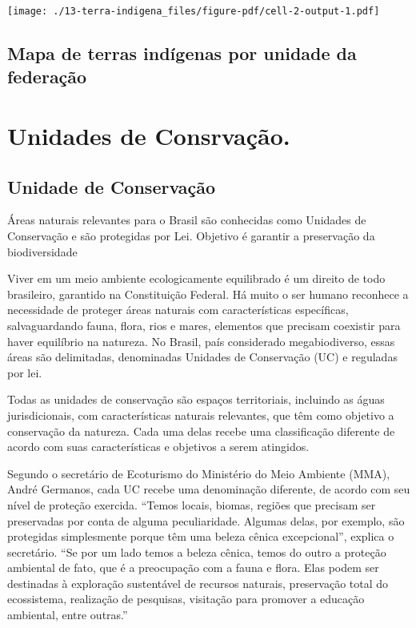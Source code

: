 \documentclass[
  letterpaper,
]{report}
\begin{document}
\texttt{[image: ./13-terra-indigena\_files/figure-pdf/cell-2-output-1.pdf]}

\hypertarget{mapa-de-terras-induxedgenas-por-unidade-da-federauxe7uxe3o}{%
\section{Mapa de terras indígenas por unidade da
federação}\label{mapa-de-terras-induxedgenas-por-unidade-da-federauxe7uxe3o}}


\hypertarget{unidades-de-consrvauxe7uxe3o.}{%
\chapter{Unidades de Consrvação.}\label{unidades-de-consrvauxe7uxe3o.}}

\hypertarget{unidade-de-conservauxe7uxe3o}{%
\section{Unidade de Conservação}\label{unidade-de-conservauxe7uxe3o}}

Áreas naturais relevantes para o Brasil são conhecidas como Unidades de
Conservação e são protegidas por Lei. Objetivo é garantir a preservação
da biodiversidade

Viver em um meio ambiente ecologicamente equilibrado é um direito de
todo brasileiro, garantido na Constituição Federal. Há muito o ser
humano reconhece a necessidade de proteger áreas naturais com
características específicas, salvaguardando fauna, flora, rios e mares,
elementos que precisam coexistir para haver equilíbrio na natureza. No
Brasil, país considerado megabiodiverso, essas áreas são delimitadas,
denominadas Unidades de Conservação (UC) e reguladas por lei.

Todas as unidades de conservação são espaços territoriais, incluindo as
águas jurisdicionais, com características naturais relevantes, que têm
como objetivo a conservação da natureza. Cada uma delas recebe uma
classificação diferente de acordo com suas características e objetivos a
serem atingidos.

Segundo o secretário de Ecoturismo do Ministério do Meio Ambiente (MMA),
André Germanos, cada UC recebe uma denominação diferente, de acordo com
seu nível de proteção exercida. ``Temos locais, biomas, regiões que
precisam ser preservadas por conta de alguma peculiaridade. Algumas
delas, por exemplo, são protegidas simplesmente porque têm uma beleza
cênica excepcional'', explica o secretário. ``Se por um lado temos a
beleza cênica, temos do outro a proteção ambiental de fato, que é a
preocupação com a fauna e flora. Elas podem ser destinadas à exploração
sustentável de recursos naturais, preservação total do ecossistema,
realização de pesquisas, visitação para promover a educação ambiental,
entre outras.''
\end{document}
